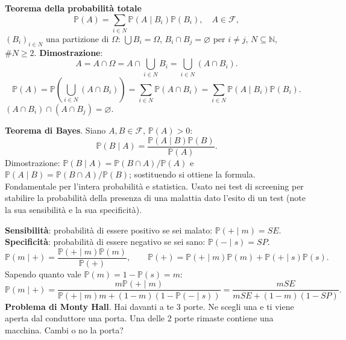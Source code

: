 \documentclass[11pt,a4paper]{article}
\newcommand{\pagina}[1]{\clearpage}
\begin{document}
\textbf{Teorema della probabilità totale}
\[\boxed{\mathbb P(A)=\sum_{i\in N}\mathbb P(A\mid B_i)\mathbb P(B_i)},\quad A\in\mathcal F,\]
$(B_i)_{i\in N}$ una partizione di $\Omega$: $\bigcup B_i=\Omega$, $B_i\cap B_j=\varnothing$ per $i\ne j$, $N\subseteq\mathbb N$, $\#N\ge2$.
\textbf{Dimostrazione}:
\[A=A\cap\Omega=A\cap\bigcup_{i\in N}B_i=\bigcup_{i\in N}(A\cap B_i).\]
\[\mathbb P(A)=\mathbb P\left(\bigcup_{i\in N}(A\cap B_i)\right)=\sum_{i\in N}\mathbb P(A\cap B_i)=\sum_{i\in N}\mathbb P(A\mid B_i)\mathbb P(B_i).\]
$(A\cap B_i)\cap(A\cap B_j)=\varnothing$.

\textbf{Teorema di Bayes}. Siano $A,B\in\mathcal F$, $\mathbb P(A)>0$:
\[\boxed{\mathbb P(B\mid A)=\frac{\mathbb P(A\mid B)\mathbb P(B)}{\mathbb P(A)}}.\]
Dimostrazione: $\mathbb P(B\mid A)=\mathbb P(B\cap A)/\mathbb P(A)$ e $\mathbb P(A\mid B)=\mathbb P(B\cap A)/\mathbb P(B)$; sostituendo si ottiene la formula.
\pagina{16}Fondamentale per l'intera probabilità e statistica. Usato nei test di screening per stabilire la probabilità della presenza di una malattia dato l'esito di un test (note la sua sensibilità e la sua specificità).

\textbf{Sensibilità}: probabilità di essere positivo se sei malato: $\mathbb P(+\mid m)=SE$.
\textbf{Specificità}: probabilità di essere negativo se sei sano: $\mathbb P(-\mid s)=SP$.
\[\mathbb P(m\mid+)=\frac{\mathbb P(+\mid m)\mathbb P(m)}{\mathbb P(+)},\qquad\mathbb P(+)=\mathbb P(+\mid m)\mathbb P(m)+\mathbb P(+\mid s)\mathbb P(s).\]
Sapendo quanto vale $\mathbb P(m)=1-\mathbb P(s)=m$:
\[\mathbb P(m\mid+)=\frac{m\mathbb P(+\mid m)}{\mathbb P(+\mid m)m+(1-m)(1-\mathbb P(-\mid s))}=\frac{mSE}{mSE+(1-m)(1-SP)}.\]
\textbf{Problema di Monty Hall}. Hai davanti a te 3 porte. Ne scegli una e ti viene aperta dal conduttore una porta. Una delle 2 porte rimaste contiene una macchina. Cambi o no la porta?
\end{document}
